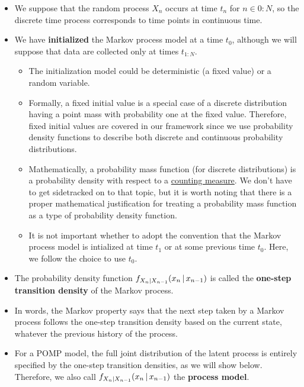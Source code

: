 \documentclass[]{article}
\begin{document}
\begin{itemize}
\item
  We suppose that the random process \(X_n\) occurs at time \(t_n\) for
  \(n\in 0:N\), so the discrete time process corresponds to time points
  in continuous time.
\item
  We have \textbf{initialized} the Markov process model at a time
  \(t_0\), although we will suppose that data are collected only at
  times \(t_{1:N}\).

  \begin{itemize}
  \item
    The initialization model could be deterministic (a fixed value) or a
    random variable.
  \item
    Formally, a fixed initial value is a special case of a discrete
    distribution having a point mass with probability one at the fixed
    value. Therefore, fixed initial values are covered in our framework
    since we use probability density functions to describe both discrete
    and continuous probability distributions.
  \item
    Mathematically, a probability mass function (for discrete
    distributions) is a probability density with respect to a
    \href{https://en.wikipedia.org/wiki/Counting_measure}{counting
    measure}. We don't have to get sidetracked on to that topic, but it
    is worth noting that there is a proper mathematical justification
    for treating a probability mass function as a type of probability
    density function.
  \item
    It is not important whether to adopt the convention that the Markov
    process model is intialized at time \(t_1\) or at some previous time
    \(t_0\). Here, we follow the choice to use \(t_0\).
  \end{itemize}
\item
  The probability density function
  \(f_{X_n|X_{n-1}}(x_n{\, | \,} x_{n-1})\) is called the \textbf{one-step
  transition density} of the Markov process.
\item
  In words, the Markov property says that the next step taken by a
  Markov process follows the one-step transition density based on the
  current state, whatever the previous history of the process.
\item
  For a POMP model, the full joint distribution of the latent process is
  entirely specified by the one-step transition densities, as we will
  show below. Therefore, we also call
  \(f_{X_n|X_{n-1}}(x_n{\, | \,} x_{n-1})\) the \textbf{process model}.
\end{itemize}
\end{document}
